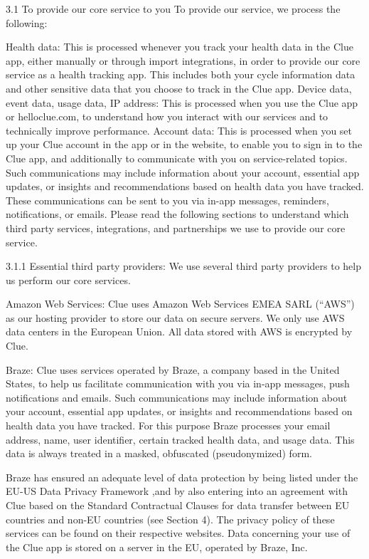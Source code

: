 3.1 To provide our core service to you
To provide our service, we process the following:

Health data: This is processed whenever you track your health data in the Clue app, either manually or through import integrations, in order to provide our core service as a health tracking app. This includes both your cycle information data and other sensitive data that you choose to track in the Clue app.
Device data, event data, usage data, IP address: This is processed when you use the Clue app or helloclue.com, to understand how you interact with our services and to technically improve performance.
Account data: This is processed when you set up your Clue account in the app or in the website, to enable you to sign in to the Clue app, and additionally to communicate with you on service-related topics. Such communications may include information about your account, essential app updates, or insights and recommendations based on health data you have tracked. These communications can be sent to you via in-app messages, reminders, notifications, or emails.
Please read the following sections to understand which third party services, integrations, and partnerships we use to provide our core service.

3.1.1 Essential third party providers:
We use several third party providers to help us perform our core services.

Amazon Web Services: Clue uses Amazon Web Services EMEA SARL (“AWS”) as our hosting provider to store our data on secure servers. We only use AWS data centers in the European Union. All data stored with AWS is encrypted by Clue.

Braze: Clue uses services operated by Braze, a company based in the United States, to help us facilitate communication with you via in-app messages, push notifications and emails. Such communications may include information about your account, essential app updates, or insights and recommendations based on health data you have tracked. For this purpose Braze processes your email address, name, user identifier, certain tracked health data, and usage data. This data is always treated in a masked, obfuscated (pseudonymized) form.

Braze has ensured an adequate level of data protection by being listed under the EU-US Data Privacy Framework ,and by also entering into an agreement with Clue based on the Standard Contractual Clauses for data transfer between EU countries and non-EU countries (see Section 4). The privacy policy of these services can be found on their respective websites. Data concerning your use of the Clue app is stored on a server in the EU, operated by Braze, Inc.

